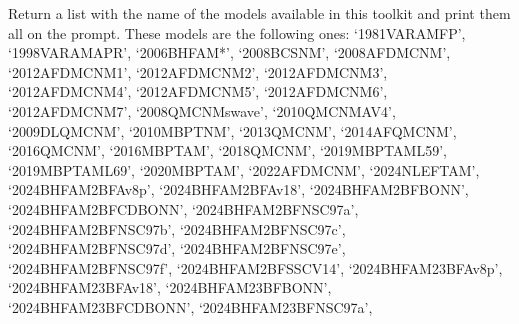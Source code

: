 \documentclass[letterpaper,10pt,english]{sphinxmanual}
\begin{document}
\begin{fulllineitems}
\label{\detokenize{source/api/setup_micro_matter:nucleardatapy.setup_micro_matter.models_micro_matter}}
\pysigstartsignatures
{}
\pysigstopsignatures
\sphinxAtStartPar
Return a list with the name of the models available in this toolkit and     print them all on the prompt. These models are the following ones:     ‘1981\sphinxhyphen{}VAR\sphinxhyphen{}AM\sphinxhyphen{}FP’, ‘1998\sphinxhyphen{}VAR\sphinxhyphen{}AM\sphinxhyphen{}APR’, ‘2006\sphinxhyphen{}BHF\sphinxhyphen{}AM*’, ‘2008\sphinxhyphen{}BCS\sphinxhyphen{}NM’, ‘2008\sphinxhyphen{}AFDMC\sphinxhyphen{}NM’,     ‘2012\sphinxhyphen{}AFDMC\sphinxhyphen{}NM\sphinxhyphen{}1’, ‘2012\sphinxhyphen{}AFDMC\sphinxhyphen{}NM\sphinxhyphen{}2’, ‘2012\sphinxhyphen{}AFDMC\sphinxhyphen{}NM\sphinxhyphen{}3’, ‘2012\sphinxhyphen{}AFDMC\sphinxhyphen{}NM\sphinxhyphen{}4’,     ‘2012\sphinxhyphen{}AFDMC\sphinxhyphen{}NM\sphinxhyphen{}5’, ‘2012\sphinxhyphen{}AFDMC\sphinxhyphen{}NM\sphinxhyphen{}6’, ‘2012\sphinxhyphen{}AFDMC\sphinxhyphen{}NM\sphinxhyphen{}7’,     ‘2008\sphinxhyphen{}QMC\sphinxhyphen{}NM\sphinxhyphen{}swave’, ‘2010\sphinxhyphen{}QMC\sphinxhyphen{}NM\sphinxhyphen{}AV4’, ‘2009\sphinxhyphen{}DLQMC\sphinxhyphen{}NM’, ‘2010\sphinxhyphen{}MBPT\sphinxhyphen{}NM’,     ‘2013\sphinxhyphen{}QMC\sphinxhyphen{}NM’, ‘2014\sphinxhyphen{}AFQMC\sphinxhyphen{}NM’, ‘2016\sphinxhyphen{}QMC\sphinxhyphen{}NM’, ‘2016\sphinxhyphen{}MBPT\sphinxhyphen{}AM’,     ‘2018\sphinxhyphen{}QMC\sphinxhyphen{}NM’, ‘2019\sphinxhyphen{}MBPT\sphinxhyphen{}AM\sphinxhyphen{}L59’, ‘2019\sphinxhyphen{}MBPT\sphinxhyphen{}AM\sphinxhyphen{}L69’,     ‘2020\sphinxhyphen{}MBPT\sphinxhyphen{}AM’, ‘2022\sphinxhyphen{}AFDMC\sphinxhyphen{}NM’, ‘2024\sphinxhyphen{}NLEFT\sphinxhyphen{}AM’,     ‘2024\sphinxhyphen{}BHF\sphinxhyphen{}AM\sphinxhyphen{}2BF\sphinxhyphen{}Av8p’, ‘2024\sphinxhyphen{}BHF\sphinxhyphen{}AM\sphinxhyphen{}2BF\sphinxhyphen{}Av18’, ‘2024\sphinxhyphen{}BHF\sphinxhyphen{}AM\sphinxhyphen{}2BF\sphinxhyphen{}BONN’, ‘2024\sphinxhyphen{}BHF\sphinxhyphen{}AM\sphinxhyphen{}2BF\sphinxhyphen{}CDBONN’,     ‘2024\sphinxhyphen{}BHF\sphinxhyphen{}AM\sphinxhyphen{}2BF\sphinxhyphen{}NSC97a’, ‘2024\sphinxhyphen{}BHF\sphinxhyphen{}AM\sphinxhyphen{}2BF\sphinxhyphen{}NSC97b’, ‘2024\sphinxhyphen{}BHF\sphinxhyphen{}AM\sphinxhyphen{}2BF\sphinxhyphen{}NSC97c’, ‘2024\sphinxhyphen{}BHF\sphinxhyphen{}AM\sphinxhyphen{}2BF\sphinxhyphen{}NSC97d’,     ‘2024\sphinxhyphen{}BHF\sphinxhyphen{}AM\sphinxhyphen{}2BF\sphinxhyphen{}NSC97e’, ‘2024\sphinxhyphen{}BHF\sphinxhyphen{}AM\sphinxhyphen{}2BF\sphinxhyphen{}NSC97f’, ‘2024\sphinxhyphen{}BHF\sphinxhyphen{}AM\sphinxhyphen{}2BF\sphinxhyphen{}SSCV14’,    ‘2024\sphinxhyphen{}BHF\sphinxhyphen{}AM\sphinxhyphen{}23BF\sphinxhyphen{}Av8p’, ‘2024\sphinxhyphen{}BHF\sphinxhyphen{}AM\sphinxhyphen{}23BF\sphinxhyphen{}Av18’, ‘2024\sphinxhyphen{}BHF\sphinxhyphen{}AM\sphinxhyphen{}23BF\sphinxhyphen{}BONN’, ‘2024\sphinxhyphen{}BHF\sphinxhyphen{}AM\sphinxhyphen{}23BF\sphinxhyphen{}CDBONN’,     ‘2024\sphinxhyphen{}BHF\sphinxhyphen{}AM\sphinxhyphen{}23BF\sphinxhyphen{}NSC97a’, 
\end{fulllineitems}
\end{document}
